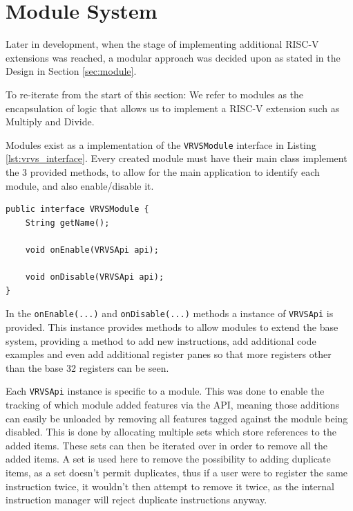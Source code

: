 \section{Module System}\label{sec:impl_mod}
Later in development, when the stage of implementing additional RISC-V \cite{fxmisc_2023_fxmiscrichtextfx} extensions was reached, a modular approach was decided upon as stated in the Design in Section \ref{sec:module}.

To re-iterate from the start of this section: We refer to modules as the encapsulation of logic that allows us to implement a RISC-V extension such as Multiply and Divide.

Modules exist as a implementation of the \texttt{VRVSModule} interface in Listing \ref{lst:vrvs_interface}. Every created module must have their main class implement the 3 provided methods, to allow for the main application to identify each module, and also enable/disable it.

\begin{lstlisting}[caption=\texttt{VRVSModule} interface for creating new modules]
public interface VRVSModule {
    String getName();

    void onEnable(VRVSApi api);

    void onDisable(VRVSApi api);
}
\end{lstlisting}

In the \verb|onEnable(...)| and \verb|onDisable(...)| methods a instance of \texttt{VRVSApi} is provided. This instance provides methods to allow modules to extend the base system, providing a method to add new instructions, add additional code examples and even add additional register panes so that more registers other than the base 32 registers can be seen.

Each \texttt{VRVSApi} instance is specific to a module. This was done to enable the tracking of which module added features via the API, meaning those additions can easily be unloaded by removing all features tagged against the module being disabled. This is done by allocating multiple sets which store references to the added items. These sets can then be iterated over in order to remove all the added items. A set is used here to remove the possibility to adding duplicate items, as a set doesn't permit duplicates, thus if a user were to register the same instruction twice, it wouldn't then attempt to remove it twice, as the internal instruction manager will reject duplicate instructions anyway.

